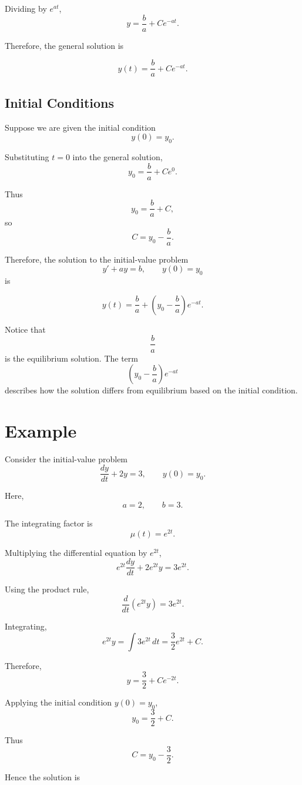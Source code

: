 \documentclass[11pt]{article}
\begin{document}
Dividing by \(e^{at}\),
\[
y
=
\frac{b}{a}+Ce^{-at}.
\]

Therefore, the general solution is

\[
\boxed{
y(t)=\frac{b}{a}+Ce^{-at}
}.
\]

\subsection{Initial Conditions}

Suppose we are given the initial condition
\[
y(0)=y_0.
\]

Substituting \(t=0\) into the general solution,
\[
y_0
=
\frac{b}{a}+Ce^0.
\]

Thus
\[
y_0=\frac{b}{a}+C,
\]
so
\[
C=y_0-\frac{b}{a}.
\]

Therefore, the solution to the initial-value problem
\[
y'+ay=b,
\qquad
y(0)=y_0
\]
is

\[
\boxed{
y(t)
=
\frac{b}{a}
+
\left(
y_0-\frac{b}{a}
\right)e^{-at}
}.
\]

Notice that
\[
\frac{b}{a}
\]
is the equilibrium solution. The term
\[
\left(
y_0-\frac{b}{a}
\right)e^{-at}
\]
describes how the solution differs from equilibrium based on the initial condition.

\section{Example}

Consider the initial-value problem
\[
\frac{dy}{dt}+2y=3,
\qquad
y(0)=y_0.
\]

Here,
\[
a=2,
\qquad
b=3.
\]

The integrating factor is
\[
\mu(t)=e^{2t}.
\]

Multiplying the differential equation by \(e^{2t}\),
\[
e^{2t}\frac{dy}{dt}
+
2e^{2t}y
=
3e^{2t}.
\]

Using the product rule,
\[
\frac{d}{dt}\left(e^{2t}y\right)
=
3e^{2t}.
\]

Integrating,
\[
e^{2t}y
=
\int 3e^{2t}\,dt
=
\frac{3}{2}e^{2t}+C.
\]

Therefore,
\[
y
=
\frac{3}{2}
+
Ce^{-2t}.
\]

Applying the initial condition \(y(0)=y_0\),
\[
y_0
=
\frac{3}{2}+C.
\]

Thus
\[
C=y_0-\frac{3}{2}.
\]

Hence the solution is
\end{document}
